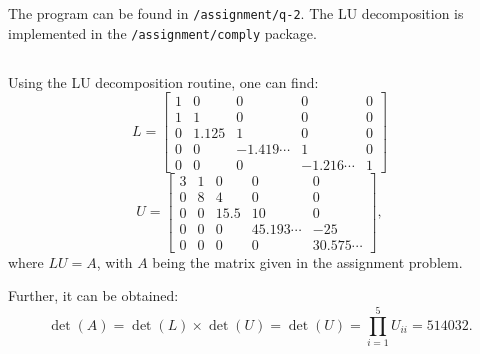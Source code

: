\documentclass[10pt, a4paper]{article}
\begin{document}
\section{}
  \subsection{}
  The program can be found in \texttt{/assignment/q-2}. The LU decomposition is implemented in the
  \texttt{/assignment/comply} package.

  \subsection{}
  Using the LU decomposition routine, one can find\footnotemark:
  \begin{equation}
    L = \begin{bmatrix}1 & 0 & 0 & 0 & 0 \\ 1 & 1 & 0 & 0 & 0 \\ 0 & 1.125 & 1 & 0 & 0 \\ 0 & 0 & -1.419\cdots & 1 & 0 \\ 0 & 0 & 0 & -1.216\cdots & 1\end{bmatrix}
  \end{equation}
  \begin{equation}
    U = \begin{bmatrix}3 & 1 & 0 & 0 & 0 \\ 0 & 8 & 4 & 0 & 0 \\ 0 & 0 & 15.5 & 10 & 0 \\ 0 & 0 & 0 & 45.193\cdots & -25 \\ 0 & 0 & 0 & 0 & 30.575\cdots\end{bmatrix},
  \end{equation}
  where $LU = A$, with $A$ being the matrix given in the assignment problem.


  Further, it can be obtained:
  \begin{equation}
    \det(A) = \det(L) \times \det(U) = \det(U) = \prod_{i=1}^5 U_{ii} = 514032.
  \end{equation}
\end{document}
